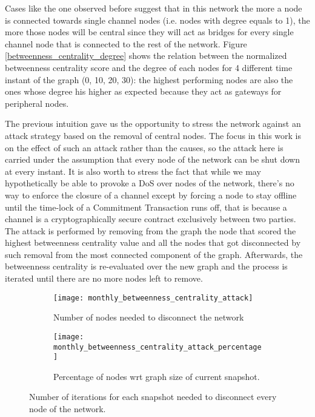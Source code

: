 	Cases like the one observed before suggest that in this network the more a node is connected towards single channel nodes (i.e. nodes with degree equals to 1), the more those nodes will be central since they will act as bridges for every single channel node that is connected to the rest of the network. Figure \ref{betweenness_centrality_degree} shows the relation between the normalized betweenness centrality score and the degree of each nodes for 4 different time instant of the graph (0, 10, 20, 30): the highest performing nodes are also the ones whose degree his higher as expected because they act as gateways for peripheral nodes. 
	
	The previous intuition gave us the opportunity to stress the network against an attack strategy based on the removal of central nodes. The focus in this work is on the effect of such an attack rather than the causes, so the attack here is carried under the assumption that every node of the network can be shut down at every instant. It is also worth to stress the fact that while we may hypothetically be able to provoke a DoS over nodes of the network, there's no way to enforce the closure of a channel except by forcing a node to stay offline until the time-lock of a Commitment Transaction runs off, that is because a channel is a cryptographically secure contract exclusively between two parties. The attack is performed by removing from the graph the node that scored the highest betweenness centrality value and all the nodes that got disconnected by such removal from the most connected component of the graph. Afterwards, the betweenness centrality is re-evaluated over the new graph and the process is iterated until there are no more nodes left to remove. 
	
	\begin{figure}[h]
		\centering
		\begin{subfigure}{0.7\textwidth}
			\centering
			\texttt{[image: monthly\_betweenness\_centrality\_attack]}
			\caption{Number of nodes needed to disconnect the network}
		\end{subfigure}
		\begin{subfigure}{0.7\textwidth}
			\centering
			\texttt{[image: monthly\_betweenness\_centrality\_attack\_percentage]}
			\caption{Percentage of nodes wrt graph size of current snapshot.}
		\end{subfigure}
		\caption{Number of iterations for each snapshot needed to disconnect every node of the network.}
		\label{betweenness_attack}
	\end{figure}
	
